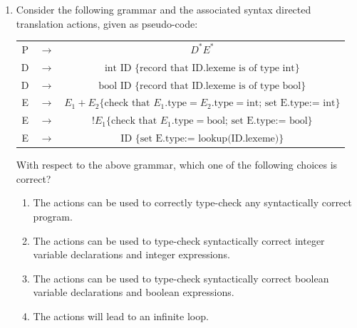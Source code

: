 \documentclass[a4paper, 11pt]{article}
\begin{document}
\begin{enumerate}
    \item Consider the following grammar  and the associated syntax directed translation  actions, given as pseudo-code:\\
    \begin{tabular}{ccc}
        P & $\rightarrow$ & $D^* E^*$\\
        D & $\rightarrow$ & $\text{int ID \{record that ID.lexeme is of type int\}}$ \\
        D & $\rightarrow$ & $\text{bool ID \{record that ID.lexeme is of type bool\}}$\\
        E & $\rightarrow$ & $E_1 + E_2 \text{\{check that } E_1\text{.type} = E_2\text{.type} = \text{int; set E.type:= int\}}$\\
        E & $\rightarrow$ & $!E_1 \text{\{check that } E_1\text{.type} = \text{bool; set E.type:= bool\}}$\\
        E & $\rightarrow$ & $ \text{ID \{set E.type:= lookup(ID.lexeme)\}}$\\
    \end{tabular}    
    With respect to the above grammar, which one of the following choices is correct?
    \begin{enumerate}
        \item The actions can be used to correctly type-check any syntactically correct program.
        \item The actions can be used to type-check syntactically correct integer variable declarations and integer expressions.
        \item The actions can be used to type-check syntactically correct boolean variable declarations and boolean expressions.
        \item The actions will lead to an infinite loop.
    \end{enumerate}
    \hfill{}
    

\end{enumerate}
\end{document}
